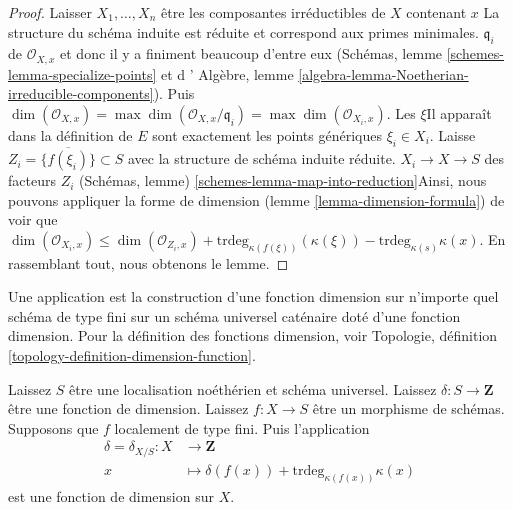 \begin{proof}

Laisser $X_1, \ldots, X_n$ être les composantes irréductibles de $X$ contenant $x$
La structure du schéma induite est réduite et correspond aux primes minimales. $\mathfrak q_i$ de
$\mathcal{O}_{X, x}$ et donc il y a finiment beaucoup d'entre eux (Schémas, lemme \ref{schemes-lemma-specialize-points} et d ' Algèbre, lemme \ref{algebra-lemma-Noetherian-irreducible-components}). Puis
$\dim(\mathcal{O}_{X, x}) = \max \dim(\mathcal{O}_{X, x}/\mathfrak q_i)
= \max \dim(\mathcal{O}_{X_i, x})$. Les $\xi$Il apparaît dans la définition de $E$ sont exactement les points génériques $\xi_i \in X_i$. Laisse $Z_i = \overline{\{f(\xi_i)\}} \subset S$
avec la structure de schéma induite réduite. $X_i \to X \to S$ des facteurs $Z_i$
(Schémas, lemme) \ref{schemes-lemma-map-into-reduction}Ainsi, nous pouvons appliquer la forme de dimension (lemme \ref{lemma-dimension-formula}) de voir que
$\dim(\mathcal{O}_{X_i, x}) \leq \dim(\mathcal{O}_{Z_i, x}) +
\text{trdeg}_{\kappa(f(\xi))}(\kappa(\xi)) -
\text{trdeg}_{\kappa(s)} \kappa(x)$. En rassemblant tout, nous obtenons le lemme.

\end{proof}

\noindent
Une application est la construction d'une fonction dimension sur n'importe quel schéma de type fini sur un schéma universel caténaire doté d'une fonction dimension. Pour la définition des fonctions dimension, voir Topologie, définition \ref{topology-definition-dimension-function}.

\begin{lemma}

\label{lemma-dimension-function-propagates}
Laissez $S$ être une localisation noéthérien et schéma universel. Laissez $\delta : S \to \mathbf{Z}$ être une fonction de dimension. Laissez $f : X \to S$ être un morphisme de schémas. Supposons que $f$ localement de type fini. Puis l'application
\begin{align*}
\delta = \delta_{X/S} : X & \longrightarrow \mathbf{Z} \\
x & \longmapsto \delta(f(x)) + \text{trdeg}_{\kappa(f(x))} \kappa(x)
\end{align*}
est une fonction de dimension sur $X$.
\end{lemma}

